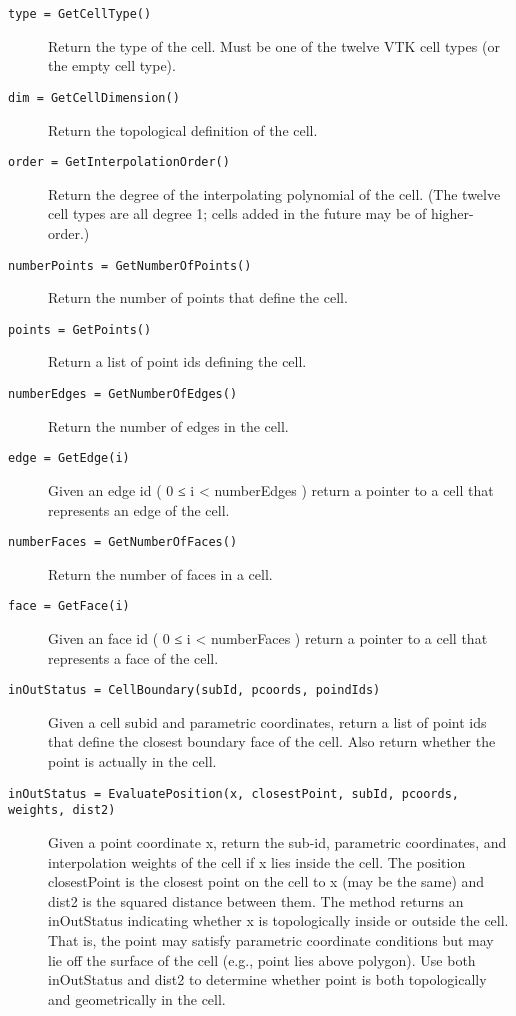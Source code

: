 \begin{description}
\begin{description}
    \item[\texttt{type = GetCellType()}]
    Return the type of the cell. Must be one of the twelve VTK cell types (or the empty cell type).

    \item[\texttt{dim = GetCellDimension()}]
    Return the topological definition of the cell.

    \item[\texttt{order = GetInterpolationOrder()}]
    Return the degree of the interpolating polynomial of the cell. (The twelve cell types are all degree 1; cells added in the future may be of higher-order.)

    \item[\texttt{numberPoints = GetNumberOfPoints()}]
    Return the number of points that define the cell.

    \item[\texttt{points = GetPoints()}]
    Return a list of point ids defining the cell.

    \item[\texttt{numberEdges = GetNumberOfEdges()}]
    Return the number of edges in the cell.

    \item[\texttt{edge = GetEdge(i)}]
    Given an edge id ( 0 ≤ i < numberEdges ) return a pointer to a cell that represents an edge of the cell.

    \item[\texttt{numberFaces = GetNumberOfFaces()}]
    Return the number of faces in a cell.

    \item[\texttt{face = GetFace(i)}]
    Given an face id ( 0 ≤ i < numberFaces ) return a pointer to a cell that represents a face of the cell.

    \item[\texttt{inOutStatus = CellBoundary(subId, pcoords, poindIds)}]
    Given a cell subid and parametric coordinates, return a list of point ids that define the closest boundary face of the cell. Also return whether the point is actually in the cell.

    \item[\texttt{inOutStatus = EvaluatePosition(x, closestPoint, subId, pcoords, weights, dist2)}]
    Given a point coordinate x, return the sub-id, parametric coordinates, and interpolation weights of the cell if x lies inside the cell. The position closestPoint is the closest point on the cell to x (may be the same) and dist2 is the squared distance between them. The method returns an inOutStatus indicating whether x is topologically inside or outside the cell. That is, the point may satisfy parametric coordinate conditions but may lie off the surface of the cell (e.g., point lies above polygon). Use both inOutStatus and dist2 to determine whether point is both topologically and geometrically in the cell.


\end{description}
\end{description}
